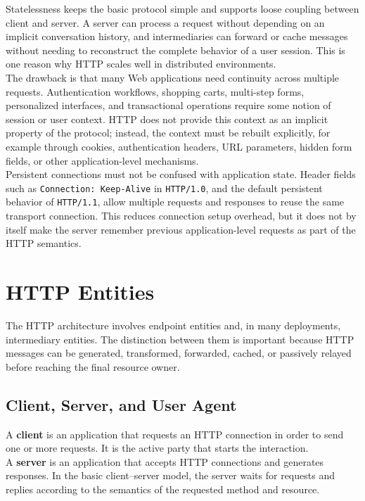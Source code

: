 \documentclass{scrbook}
\begin{document}
Statelessness keeps the basic protocol simple and supports loose coupling between client and server. A server can process a request without depending on an implicit conversation history, and intermediaries can forward or cache messages without needing to reconstruct the complete behavior of a user session. This is one reason why HTTP scales well in distributed environments.\\

The drawback is that many Web applications need continuity across multiple requests. Authentication workflows, shopping carts, multi-step forms, personalized interfaces, and transactional operations require some notion of session or user context. HTTP does not provide this context as an implicit property of the protocol; instead, the context must be rebuilt explicitly, for example through cookies, authentication headers, URL parameters, hidden form fields, or other application-level mechanisms.\\

Persistent connections must not be confused with application state. Header fields such as \texttt{Connection: Keep-Alive} in \texttt{HTTP/1.0}, and the default persistent behavior of \texttt{HTTP/1.1}, allow multiple requests and responses to reuse the same transport connection. This reduces connection setup overhead, but it does not by itself make the server remember previous application-level requests as part of the HTTP semantics.

\section{HTTP Entities}

The HTTP architecture involves endpoint entities and, in many deployments, intermediary entities. The distinction between them is important because HTTP messages can be generated, transformed, forwarded, cached, or passively relayed before reaching the final resource owner.

\subsection{Client, Server, and User Agent}

A \textbf{client} is an application that requests an HTTP connection in order to send one or more requests. It is the active party that starts the interaction.\\

A \textbf{server} is an application that accepts HTTP connections and generates responses. In the basic client--server model, the server waits for requests and replies according to the semantics of the requested method and resource.\\
\end{document}
